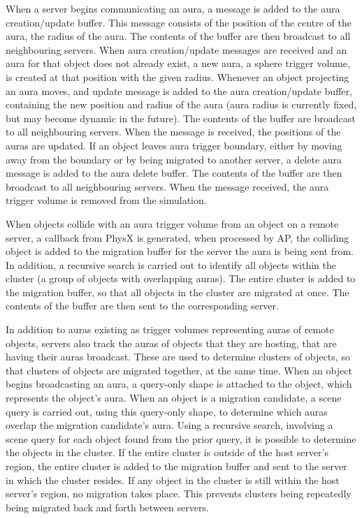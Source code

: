 When a server begins communicating an aura, a message is added to the aura creation/update buffer. This message consists of the position of the centre of the aura, the radius of the aura. %
The contents of the buffer are then broadcast to all neighbouring servers. When aura creation/update messages are received and an aura for that object does not already exist, a new aura, a sphere trigger volume, is created at that position with the given radius.
Whenever an object projecting an aura moves, and update message is added to the aura creation/update buffer, containing the new position and radius of the aura (aura radius is currently fixed, but may become dynamic in the future). The contents of the buffer are broadcast to all neighbouring servers. When the message is received, the positions of the auras are updated. 
If an object leaves aura trigger boundary, either by moving away from the boundary or by being migrated to another server, a delete aura message is added to the aura delete buffer. The contents of the buffer are then broadcast to all neighbouring servers. When the message received, the aura trigger volume is removed from the simulation.

When objects collide with an aura trigger volume from an object on a remote server, a callback from PhysX is generated, when processed by AP, the colliding object is added to the migration buffer for the server the aura is being sent from. In addition, a recursive search is carried out to identify all objects within the cluster (a group of objects with overlapping auras). The entire cluster is added to the migration buffer, so that all objects in the cluster are migrated at once. The contents of the buffer are then sent to the corresponding server.

In addition to auras existing as trigger volumes representing auras of remote objects, servers also track the auras of objects that they are hosting, that are having their auras broadcast. These are used to determine clusters of objects, so that clusters of objects are migrated together, at the same time. When an object begins broadcasting an aura, a query-only shape is attached to the object, which represents the object's aura. When an object is a migration candidate, a scene query is carried out, using this query-only shape, to determine which auras overlap the migration candidate's aura. Using a recursive search, involving a scene query for each object found from the prior query, it is possible to determine the objects in the cluster. If the entire cluster is outside of the host server's region, the entire cluster is added to the migration buffer and sent to the server in which the cluster resides. If any object in the cluster is still within the host server's region, no migration takes place. This prevents clusters being repeatedly being migrated back and forth between servers.

